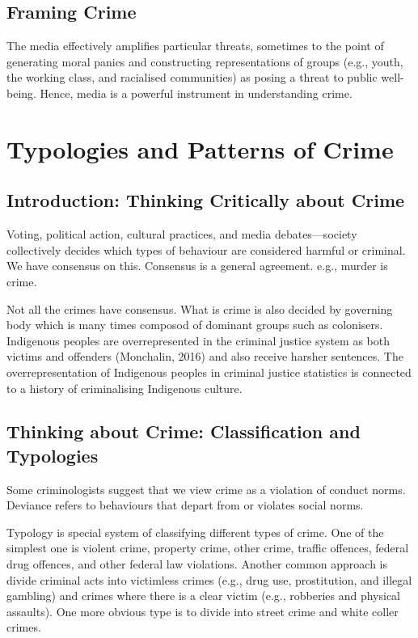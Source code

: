 \documentclass{article}
\begin{document}
\subsection{Framing Crime}

The media effectively amplifies particular threats, sometimes to the point of generating moral panics and constructing representations of groups (e.g., youth, the working class, and racialised communities) as posing a threat to public well-being. Hence, media is a powerful instrument in understanding crime.

\section{Typologies and Patterns of Crime}


\subsection{Introduction: Thinking Critically about Crime}

Voting, political action, cultural practices, and media debates—society collectively decides which types of behaviour are considered harmful or criminal. We have consensus on this. Consensus is a general agreement. e.g., murder is crime.

Not all the crimes have consensus. What is crime is also decided by governing body which is many times composod of dominant groups such as colonisers. Indigenous peoples are overrepresented in the criminal justice system as both victims and offenders (Monchalin, 2016) and also receive harsher sentences. The overrepresentation of Indigenous peoples in criminal justice statistics is connected to a history of criminalising Indigenous culture.

\subsection{Thinking about Crime: Classification and Typologies}

Some criminologists suggest that we view crime as a violation of conduct norms. Deviance refers to behaviours that depart from or violates social norms.

Typology is special system of classifying different types of crime. One of the simplest one is violent crime, property crime, other crime, traffic offences, federal drug offences, and other federal law violations. Another common approach is divide criminal acts into victimless crimes (e.g., drug use, prostitution, and illegal gambling) and crimes where there is a clear victim (e.g., robberies and physical assaults). One more obvious type is to divide into street crime and white coller crimes.
\end{document}
